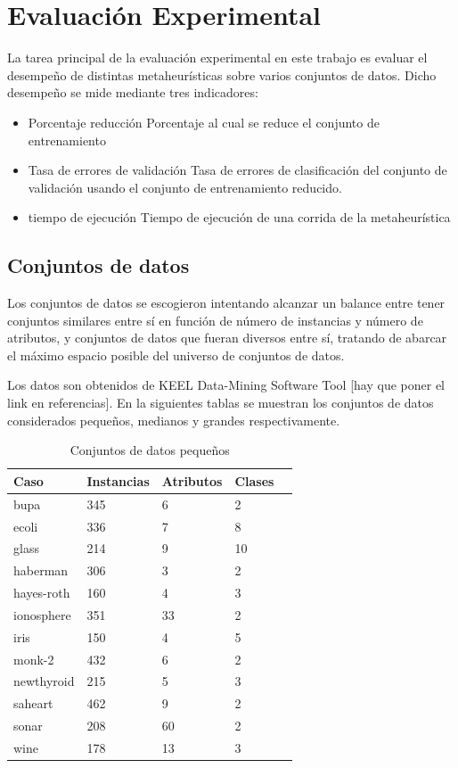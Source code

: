 \documentclass[11pt]{article}
\begin{document}
\clearpage

\section{Evaluación Experimental}

La tarea principal de la evaluación experimental en este trabajo es evaluar el desempeño de distintas metaheurísticas sobre varios conjuntos de datos. Dicho desempeño se mide mediante tres indicadores: 
\begin{itemize}
\item Porcentaje reducción 
    Porcentaje al cual se reduce el conjunto de entrenamiento
\item Tasa de errores de validación
    Tasa de errores de clasificación del conjunto de validación usando el conjunto de entrenamiento reducido.
\item tiempo de ejecución
    Tiempo de ejecución de una corrida de la metaheurística
\end{itemize}


\subsection{Conjuntos de datos}
Los conjuntos de datos se escogieron intentando alcanzar un balance entre tener conjuntos similares entre sí en función de número de instancias y número de atributos, y conjuntos de datos que fueran diversos entre sí, tratando de abarcar el máximo espacio posible del universo de conjuntos de datos.

Los datos son obtenidos de KEEL 
Data-Mining Software Tool [hay que poner el link en referencias].
En la siguientes tablas se muestran los conjuntos de datos considerados pequeños, medianos y grandes respectivamente.

\begin{table}[h]
\begin{tabular}{ |l|l|l|l|l| }
    \hline
    Caso    & Instancias & Atributos & Clases \\ \hline
    bupa & 345  & 6 &  2 \\ \hline
    ecoli & 336 & 7 & 8 \\ \hline
    glass & 214 & 9 & 10 \\ \hline
    haberman & 306 & 3 & 2 \\ \hline
    hayes-roth & 160 & 4 & 3 \\ \hline
    ionosphere & 351 & 33 & 2 \\ \hline
    iris & 150 & 4 & 5 \\ \hline
    monk-2 & 432 & 6 & 2 \\ \hline
    newthyroid & 215  & 5 & 3 \\ \hline
    saheart & 462 & 9 & 2 \\ \hline
    sonar & 208 & 60 & 2 \\ \hline
    wine & 178 & 13 & 3 \\ \hline
\end{tabular}
\caption{Conjuntos de datos pequeños}
\label{tabla:1}
\end{table}
\end{document}
